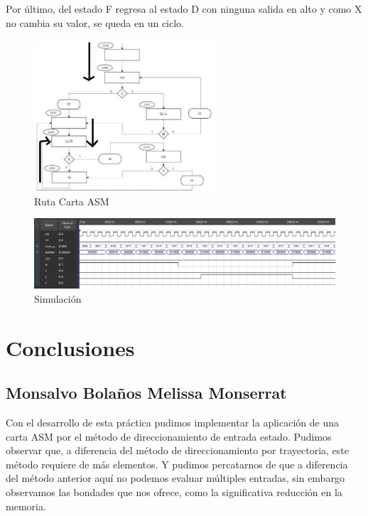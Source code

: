 \documentclass[table]{scrartcl}
\begin{document}
Por último, del estado F regresa al estado D con ninguna salida en alto y como
X no cambia su valor, se queda en un ciclo.
\begin{figure}[htbp]
  \centering
  \includegraphics[width=0.6\textwidth]{./img/ruta.png}
  \caption{Ruta Carta ASM}
\end{figure}
\begin{figure}[htbp]
  \centering
  \includegraphics[width=\textwidth]{./img/sim.png}
  \caption{Simulación}
\end{figure}

\section{Conclusiones}
\label{sec:orgdab2190}

\subsection*{Monsalvo Bolaños Melissa Monserrat}\label{sec:mons-bolan-melissa}

Con el desarrollo de esta práctica pudimos implementar la aplicación de una
carta ASM por el método de direccionamiento de entrada estado. Pudimos
observar que, a diferencia del método de direccionamiento por trayectoria,
este método requiere de más elementos. Y pudimos percatarnos de que a
diferencia del método anterior aquí no podemos evaluar múltiples entradas,
sin embargo observamos las bondades que nos ofrece, como la significativa
reducción en la memoria.
\end{document}
